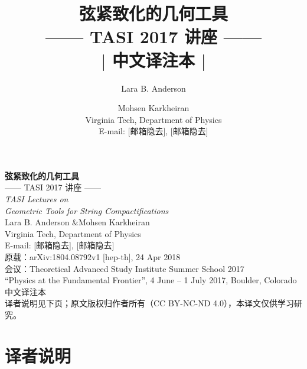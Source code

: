 \documentclass[11pt,a4paper,UTF8,fontset=fandol]{ctexart}
\title{\bfseries 弦紧致化的几何工具\\[0.35em]
       \large —— TASI 2017 讲座 ——\\[0.8em]
       {\normalsize\normalfont$|$ 中文译注本 $|$}}
\author{Lara B. Anderson \and Mohsen Karkheiran\\[0.3em]
        {\small Virginia Tech, Department of Physics}\\[0.3em]
        {\small E-mail: [邮箱隐去], [邮箱隐去]}}
\date{}
\begin{document}
\begin{titlepage}
\centering
\vspace*{1.2cm}
{\LARGE\bfseries 弦紧致化的几何工具}\\[0.5cm]
{\large —— TASI 2017 讲座 ——}\\[1.2cm]
{\Large\itshape TASI Lectures on\\[0.2em] Geometric Tools for String Compactifications}\\[1.5cm]
{\large Lara B. Anderson \quad\&\quad Mohsen Karkheiran}\\[0.4cm]
{\normalsize Virginia Tech, Department of Physics}\\[0.4cm]
{\small E-mail: [邮箱隐去], [邮箱隐去]}\\[2.0cm]
{\normalsize 原载：arXiv:1804.08792v1 [hep-th], 24 Apr 2018}\\[0.2cm]
{\normalsize 会议：Theoretical Advanced Study Institute Summer School 2017}\\[0.1cm]
{\normalsize ``Physics at the Fundamental Frontier'', 4 June -- 1 July 2017, Boulder, Colorado}\\[1.8cm]
{\normalsize 中文译注本}\\[0.3cm]
{\small 译者说明见下页；原文版权归作者所有（CC BY-NC-ND 4.0），本译文仅供学习研究。}
\vfill
\end{titlepage}

\thispagestyle{plain}
\section*{译者说明}
\end{document}
